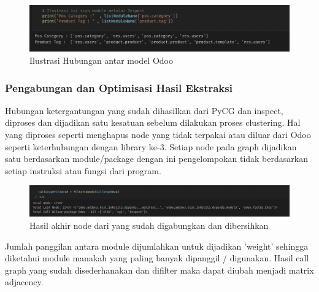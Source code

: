 \begin{figure}[htbp]
	\centering
	\includegraphics[width=1\textwidth]{img/bab_4/IlustrasiScan.png}
	\caption{Ilustrasi Hubungan antar model Odoo }
	\label{fig:example}
\end{figure}

\subsubsection{Pengabungan dan Optimisasi Hasil Ekstraksi}
Hubungan ketergantungan yang sudah dihasilkan dari PyCG dan inspect, diproses dan dijadikan satu kesatuan sebelum dilakukan proses clustering. Hal yang diproses seperti menghapus node yang tidak terpakai atau diluar dari Odoo seperti keterhubungan dengan library ke-3.  Setiap node pada graph dijadikan satu berdasarkan module/package dengan ini pengelompokan tidak berdasarkan setiap instruksi atau fungsi dari program. 

\begin{figure}[htbp]
	\centering
	\includegraphics[width=1\textwidth]{img/bab_4/FilterScan.png}
	\caption{Hasil akhir node dari yang sudah digabungkan dan dibersihkan}
	\label{fig:example}
\end{figure}


Jumlah panggilan antara module dijumlahkan untuk dijadikan 'weight' sehingga diketahui module manakah yang paling banyak dipanggil / digunakan. Hasil call graph yang sudah disederhanakan dan difilter maka dapat diubah menjadi matrix adjacency.


